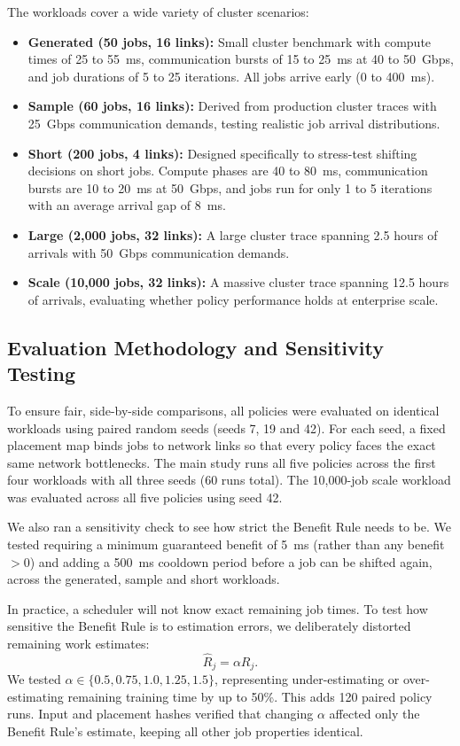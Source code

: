 \documentclass[conference]{IEEEtran}
\begin{document}
The workloads cover a wide variety of cluster scenarios:
\begin{itemize}
    \item \textbf{Generated (50 jobs, 16 links):} Small cluster benchmark with compute times of 25 to 55~ms, communication bursts of 15 to 25~ms at 40 to 50~Gbps, and job durations of 5 to 25 iterations. All jobs arrive early (0 to 400~ms).
    \item \textbf{Sample (60 jobs, 16 links):} Derived from production cluster traces with 25~Gbps communication demands, testing realistic job arrival distributions.
    \item \textbf{Short (200 jobs, 4 links):} Designed specifically to stress-test shifting decisions on short jobs. Compute phases are 40 to 80~ms, communication bursts are 10 to 20~ms at 50~Gbps, and jobs run for only 1 to 5 iterations with an average arrival gap of 8~ms.
    \item \textbf{Large (2,000 jobs, 32 links):} A large cluster trace spanning 2.5 hours of arrivals with 50~Gbps communication demands.
    \item \textbf{Scale (10,000 jobs, 32 links):} A massive cluster trace spanning 12.5 hours of arrivals, evaluating whether policy performance holds at enterprise scale.
\end{itemize}

\subsection{Evaluation Methodology and Sensitivity Testing}

To ensure fair, side-by-side comparisons, all policies were evaluated on identical workloads using paired random seeds (seeds 7, 19 and 42). For each seed, a fixed placement map binds jobs to network links so that every policy faces the exact same network bottlenecks. The main study runs all five policies across the first four workloads with all three seeds (60 runs total). The 10,000-job scale workload was evaluated across all five policies using seed 42.

We also ran a sensitivity check to see how strict the Benefit Rule needs to be. We tested requiring a minimum guaranteed benefit of 5~ms (rather than any benefit $> 0$) and adding a 500~ms cooldown period before a job can be shifted again, across the generated, sample and short workloads.

In practice, a scheduler will not know exact remaining job times. To test how sensitive the Benefit Rule is to estimation errors, we deliberately distorted remaining work estimates:
$$\widehat{R}_j = \alpha R_j.$$
We tested $\alpha \in \{0.5, 0.75, 1.0, 1.25, 1.5\}$, representing under-estimating or over-estimating remaining training time by up to 50\%. This adds 120 paired policy runs. Input and placement hashes verified that changing $\alpha$ affected only the Benefit Rule's estimate, keeping all other job properties identical.
\end{document}
